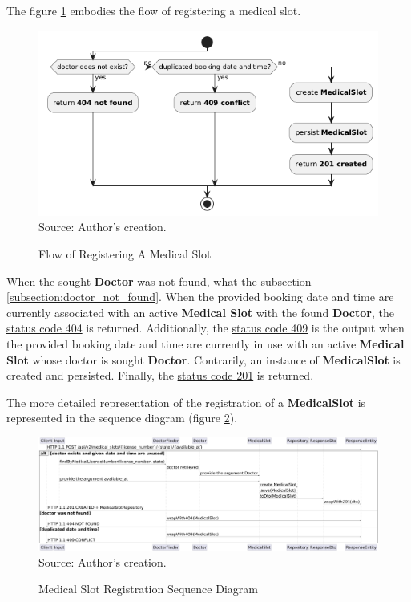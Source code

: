 The figure \ref{fig:medical_slot_registration_activity_diagra} embodies the flow of registering a medical slot.

\begin{figure}[H]
	\centering
	\caption{Flow of Registering A Medical Slot}
	\includegraphics[width=1\linewidth]{figures/medical_slot_registration_activity_diagram.png}
	\label{fig:medical_slot_registration_activity_diagra}
	\footnotesize Source: Author's creation.
\end{figure}

When the sought \textbf{Doctor} was not found, what the subsection \ref{subsection:doctor_not_found}. When the provided booking date and time are currently associated with an active \textbf{Medical Slot} with the found \textbf{Doctor}, the \hyperref[appendix:glossary]{status code 404} is returned. Additionally, the \hyperref[appendix:glossary]{status code 409} is the output when the provided booking date and time are currently in use with an active \textbf{Medical Slot} whose doctor is sought \textbf{Doctor}. Contrarily, an instance of \textbf{MedicalSlot} is created and persisted. Finally, the \hyperref[tab:summary_http_status_codes]{status code 201} is returned.

The more detailed representation of the registration of a \textbf{MedicalSlot} is represented in the sequence diagram (figure \ref{fig:medical_slot_registration_sequence_diagram}).

\begin{figure}[H]
	\centering
	\caption{Medical Slot Registration Sequence Diagram}
	\includegraphics[width=1\linewidth]{figures/medical_slot_registration_sequence_diagram.png}
	\label{fig:medical_slot_registration_sequence_diagram}
	\footnotesize Source: Author's creation.
\end{figure}

